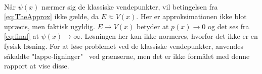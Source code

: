 \\
Når $\psi(x)$ nærmer sig de klassiske vendepunkter, vil betingelsen fra \cref{eq:TheApprox} ikke gælde, da $E \approx V(x)$. Her er approksimationen ikke blot upræcis, men faktisk ugyldig. $E \rightarrow V(x)$ betyder at $p(x) \rightarrow 0$ og det ses fra \cref{eq:final}  at $\psi(x) \rightarrow \infty$. Løsningen her kan ikke normeres, hvorfor det ikke er en fysisk løsning. For at løse problemet ved de klassiske vendepunkter, anvendes såkaldte "lappe-ligninger" \ ved grænserne, men det er ikke formålet med denne rapport at vise disse.
